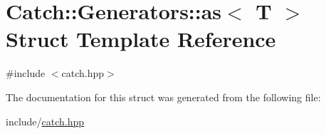 \hypertarget{struct_catch_1_1_generators_1_1as}{}\section{Catch\+::Generators\+::as$<$ T $>$ Struct Template Reference}
\label{struct_catch_1_1_generators_1_1as}


{\ttfamily \#include $<$catch.\+hpp$>$}



The documentation for this struct was generated from the following file\+:\begin{DoxyCompactItemize}
\item 
include/\mbox{\hyperlink{catch_8hpp}{catch.\+hpp}}\end{DoxyCompactItemize}
